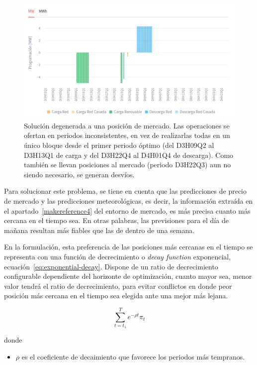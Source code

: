 \begin{figure}
  \centering
  \includegraphics[width=0.75\linewidth]{figures/solucion-degenerada.png}
  \caption[Solución degenerada.]{Solución degenerada a una posición de mercado. Las operaciones se ofertan en periodos inconsistentes, en vez de realizarlas todas en un único bloque desde el primer periodo óptimo (del D3H09Q2 al D3H13Q1 de carga y del D3H22Q4 al D4H01Q4 de descarga). Como también se llevan posiciones al mercado (periodo D3H22Q3) aun no siendo necesario, se generan desvíos.}
  \label{fig:solucion-degenerada}
\end{figure}

Para solucionar este problema, se tiene en cuenta que las predicciones de precio de mercado y las predicciones meteorológicas, es decir, la información extraída en el apartado~\ref{makereference4} del entorno de mercado, es más precisa cuanto más cercana en el tiempo sea. En otras palabras, las previsiones para el día de mañana resultan más fiables que las de dentro de una semana.

En la formulación, esta preferencia de las posiciones más cercanas en el tiempo se representa con una función de decrecimiento o \textit{decay function} exponencial, ecuación~\ref{eq:exponential-decay}. Dispone de un ratio de decrecimiento configurable dependiente del horizonte de optimización, cuanto mayor sea, menor valor tendrá el ratio de decrecimiento, para evitar conflictos en donde peor posición más cercana en el tiempo sea elegida ante una mejor más lejana.

\begin{samepage}

\begin{equation}
  \label{eq:exponential-decay}
    \sum_{t = t_{1}}^{T} e^{-\rho t} \pi_{t}
\end{equation}

  donde

  \begin{itemize}
    \item \( \rho \) es el coeficiente de decaimiento que favorece los periodos más tempranos.
  \end{itemize}

\end{samepage}


